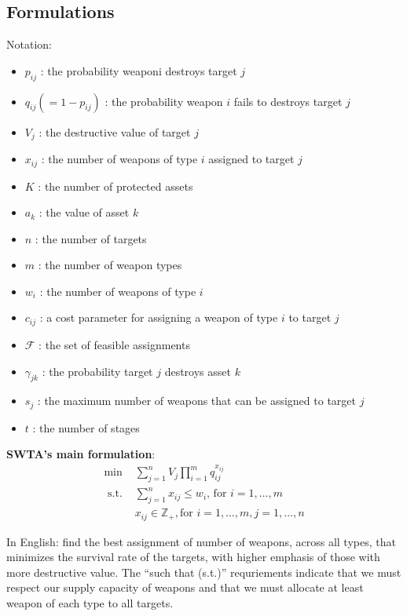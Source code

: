 \documentclass[12pt]{article} %
\begin{document}
\subsection*{Formulations}

Notation:
\begin{itemize}
    \item $p_{i j}$ : the probability weaponi destroys target $j$
    \item $q_{i j} (= 1 - p_{i j})$ : the probability weapon $i$ fails to destroys target $j$
    \item $V_j$ : the destructive value of target $j$
    \item $x_{i j}$ : the number of weapons of type $i$ assigned to target $j$
    \item $K$ : the number of protected assets
    \item $a_k$ : the value of asset $k$
    \item $n$ : the number of targets
    \item $m$ : the number of weapon types
    \item $w_i$ : the number of weapons of type $i$
    \item $c_{i j}$ : a cost parameter for assigning a weapon of type $i$ to target $j$
    \item $\mathcal{F}$ : the set of feasible assignments
    \item $\gamma_{j k}$ : the probability target $j$ destroys asset $k$
    \item $s_j$ : the maximum number of weapons that can be assigned to target $j$
    \item $t$ : the number of stages
\end{itemize}


{\bf SWTA's main formulation}:
$$
\begin{array}{ll}
\min & \sum_{j=1}^n V_j \prod_{i=1}^m q_{i j}^{x_{i j}} \\
\text { s.t. } & \sum_{j=1}^n x_{i j} \leq w_i \text {, for } i=1, \ldots, m \\
& x_{i j} \in \mathbb{Z}_{+}, \text {for } i=1, \ldots, m, j=1, \ldots, n
\end{array}
$$

In English: find the best assignment of number of weapons, across all types,
that minimizes the survival rate of the targets, with higher emphasis of those with more destructive value.
The ``such that (s.t.)'' requriements indicate that we must respect our supply capacity of weapons and 
that we must allocate at least weapon of each type to all targets.\\
\end{document}
